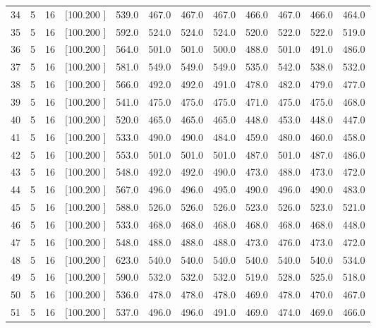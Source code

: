 \documentclass[12pt,a4paper]{article}
\begin{document}
\begin{center}
{\begin{tabular}{r r r r r r r r r r r r}
  34&  5& 16&[100.200   ]&   539.0&   467.0&   467.0&   467.0&   466.0&   467.0&   466.0&   464.0\\[-0.02in]
  35&  5& 16&[100.200   ]&   592.0&   524.0&   524.0&   524.0&   520.0&   522.0&   522.0&   519.0\\[-0.02in]
  36&  5& 16&[100.200   ]&   564.0&   501.0&   501.0&   500.0&   488.0&   501.0&   491.0&   486.0\\[-0.02in]
  37&  5& 16&[100.200   ]&   581.0&   549.0&   549.0&   549.0&   535.0&   542.0&   538.0&   532.0\\[-0.02in]
  38&  5& 16&[100.200   ]&   566.0&   492.0&   492.0&   491.0&   478.0&   482.0&   479.0&   477.0\\[-0.02in]
  39&  5& 16&[100.200   ]&   541.0&   475.0&   475.0&   475.0&   471.0&   475.0&   475.0&   468.0\\[-0.02in]
  40&  5& 16&[100.200   ]&   520.0&   465.0&   465.0&   465.0&   448.0&   453.0&   448.0&   447.0\\[-0.02in]
  41&  5& 16&[100.200   ]&   533.0&   490.0&   490.0&   484.0&   459.0&   480.0&   460.0&   458.0\\[-0.02in]
  42&  5& 16&[100.200   ]&   553.0&   501.0&   501.0&   501.0&   487.0&   501.0&   487.0&   486.0\\[-0.02in]
  43&  5& 16&[100.200   ]&   548.0&   492.0&   492.0&   490.0&   473.0&   488.0&   473.0&   472.0\\[-0.02in]
  44&  5& 16&[100.200   ]&   567.0&   496.0&   496.0&   495.0&   490.0&   496.0&   490.0&   483.0\\[-0.02in]
  45&  5& 16&[100.200   ]&   588.0&   526.0&   526.0&   526.0&   523.0&   526.0&   523.0&   521.0\\[-0.02in]
  46&  5& 16&[100.200   ]&   533.0&   468.0&   468.0&   468.0&   468.0&   468.0&   468.0&   448.0\\[-0.02in]
  47&  5& 16&[100.200   ]&   548.0&   488.0&   488.0&   488.0&   473.0&   476.0&   473.0&   472.0\\[-0.02in]
  48&  5& 16&[100.200   ]&   623.0&   540.0&   540.0&   540.0&   540.0&   540.0&   540.0&   534.0\\[-0.02in]
  49&  5& 16&[100.200   ]&   590.0&   532.0&   532.0&   532.0&   519.0&   528.0&   525.0&   518.0\\[-0.02in]
  50&  5& 16&[100.200   ]&   536.0&   478.0&   478.0&   478.0&   469.0&   478.0&   470.0&   467.0\\[-0.02in]
  51&  5& 16&[100.200   ]&   537.0&   496.0&   496.0&   491.0&   469.0&   474.0&   469.0&   466.0\\[-0.02in]

\end{tabular}}
\end{center}
\end{document}
